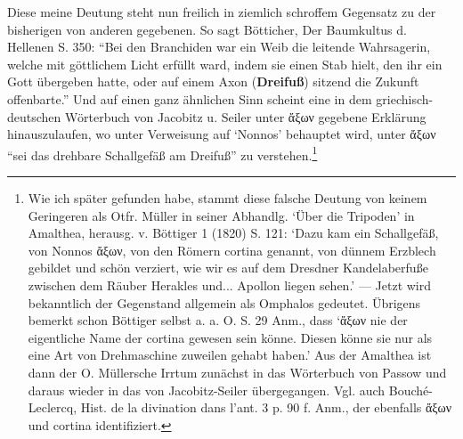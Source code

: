 \documentclass[a4paper, 11pt, oneside]{article}
\begin{document}
Diese meine Deutung steht nun freilich in ziemlich schroffem Gegensatz zu der bisherigen von anderen gegebenen. So sagt Bötticher, Der Baumkultus d. Hellenen S. 350: "`Bei den Branchiden war ein Weib die leitende Wahrsagerin, welche mit göttlichem Licht erfüllt ward, indem sie einen Stab hielt, den ihr ein Gott übergeben hatte, oder auf einem Axon (\textbf{Dreifuß}) sitzend die Zukunft offenbarte."' Und auf einen ganz ähnlichen Sinn scheint eine in dem griechisch-deutschen Wörterbuch von Jacobitz u. Seiler unter ἄξων gegebene Erklärung hinauszulaufen, wo unter Verweisung auf `Nonnos' behauptet wird, unter ἄξων "`sei das drehbare Schallgefäß am Dreifuß"' zu verstehen.\footnote{Wie ich später gefunden habe, stammt diese falsche Deutung von keinem Geringeren als Otfr. Müller in seiner Abhandlg. `Über die Tripoden' in Amalthea, herausg. v. Böttiger 1 (1820) S. 121: `Dazu kam ein Schallgefäß, von Nonnos ἄξων, von den Römern cortina genannt, von dünnem Erzblech gebildet und schön verziert, wie wir es auf dem Dresdner Kandelaberfuße zwischen dem Räuber Herakles und... Apollon liegen sehen.' --- Jetzt wird bekanntlich der Gegenstand allgemein als Omphalos gedeutet. Übrigens bemerkt schon Böttiger selbst a. a. O. S. 29 Anm., dass `ἄξων nie der eigentliche Name der cortina gewesen sein könne. Diesen könne sie nur als eine Art von Drehmaschine zuweilen gehabt haben.' Aus der Amalthea ist dann der O. Müllersche Irrtum zunächst in das Wörterbuch von Passow und daraus wieder in das von Jacobitz-Seiler übergegangen. Vgl. auch Bouché-Leclercq, Hist. de la divination dans l'ant. 3 p. 90 f. Anm., der ebenfalls ἄξων und cortina identifiziert.}
\end{document}
